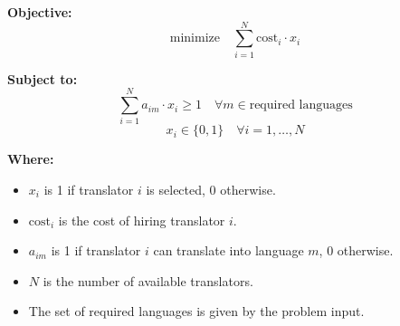 \documentclass{article}
\begin{document}
\textbf{Objective:}
\[
\text{minimize} \quad \sum_{i=1}^{N} \text{cost}_i \cdot x_i
\]

\textbf{Subject to:}
\[
\sum_{i=1}^{N} a_{im} \cdot x_i \geq 1 \quad \forall m \in \text{required languages}
\]
\[
x_i \in \{0, 1\} \quad \forall i = 1, \ldots, N
\]

\textbf{Where:}
\begin{itemize}
    \item \( x_i \) is 1 if translator \( i \) is selected, 0 otherwise.
    \item \( \text{cost}_i \) is the cost of hiring translator \( i \).
    \item \( a_{im} \) is 1 if translator \( i \) can translate into language \( m \), 0 otherwise.
    \item \( N \) is the number of available translators.
    \item The set of required languages is given by the problem input.
\end{itemize}
\end{document}
